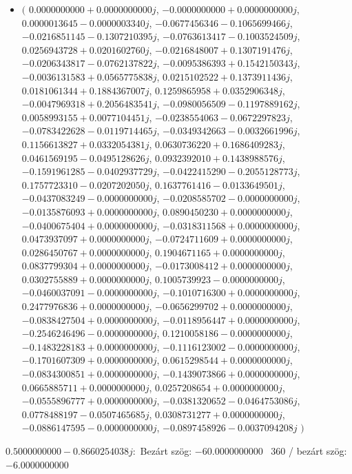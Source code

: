 \documentclass[14pt,a4paper]{article}
\begin{document}
\begin{itemize}
\item
$\big($
$0.0000000000+0.0000000000j$, $-0.0000000000+0.0000000000j$, $0.0000013645-0.0000003340j$, $-0.0677456346-0.1065699466j$, $-0.0216851145-0.1307210395j$, $-0.0763613417-0.1003524509j$, $0.0256943728+0.0201602760j$, $-0.0216848007+0.1307191476j$, $-0.0206343817-0.0762137822j$, $-0.0095386393+0.1542150343j$, $-0.0036131583+0.0565775838j$, $0.0215102522+0.1373911436j$, $0.0181061344+0.1884367007j$, $0.1259865958+0.0352906348j$, $-0.0047969318+0.2056483541j$, $-0.0980056509-0.1197889162j$, $0.0058993155+0.0077104451j$, $-0.0238554063-0.0672297823j$, $-0.0783422628-0.0119714465j$, $-0.0349342663-0.0032661996j$, $0.1156613827+0.0332054381j$, $0.0630736220+0.1686409283j$, $0.0461569195-0.0495128626j$, $0.0932392010+0.1438988576j$, $-0.1591961285-0.0402937729j$, $-0.0422415290-0.2055128773j$, $0.1757723310-0.0207202050j$, $0.1637761416-0.0133649501j$, $-0.0437083249-0.0000000000j$, $-0.0208585702-0.0000000000j$, $-0.0135876093+0.0000000000j$, $0.0890450230+0.0000000000j$, $-0.0400675404+0.0000000000j$, $-0.0318311568+0.0000000000j$, $0.0473937097+0.0000000000j$, $-0.0724711609+0.0000000000j$, $0.0286450767+0.0000000000j$, $0.1904671165+0.0000000000j$, $0.0837799304+0.0000000000j$, $-0.0173008412+0.0000000000j$, $0.0302755889+0.0000000000j$, $0.1005739923-0.0000000000j$, $-0.0460037091-0.0000000000j$, $-0.1010716300+0.0000000000j$, $0.2477976836+0.0000000000j$, $-0.0656299702+0.0000000000j$, $-0.0838427504+0.0000000000j$, $-0.0118956447+0.0000000000j$, $-0.2546246496-0.0000000000j$, $0.1210058186-0.0000000000j$, $-0.1483228183+0.0000000000j$, $-0.1116123002-0.0000000000j$, $-0.1701607309+0.0000000000j$, $0.0615298544+0.0000000000j$, $-0.0834300851+0.0000000000j$, $-0.1439073866+0.0000000000j$, $0.0665885711+0.0000000000j$, $0.0257208654+0.0000000000j$, $-0.0555896777+0.0000000000j$, $-0.0381320652-0.0464753086j$, $0.0778488197-0.0507465685j$, $0.0308731277+0.0000000000j$, $-0.0886147595-0.0000000000j$, $-0.0897458926-0.0037094208j$
$\big)$
\end{itemize}
$0.5000000000-0.8660254038j$:\
Bezárt szög: $-60.0000000000$ \
360 / bezárt szög: $-6.0000000000$\
\end{document}
